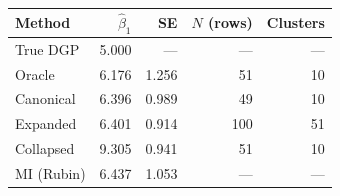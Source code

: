 \begin{tabular}{lrrrr}
\toprule
Method & $\hat\beta_1$ & SE & $N$ (rows) & Clusters \\
\midrule
True DGP & 5.000 & --- & --- & --- \\
Oracle & 6.176 & 1.256 & 51 & 10 \\
Canonical & 6.396 & 0.989 & 49 & 10 \\
Expanded & 6.401 & 0.914 & 100 & 51 \\
Collapsed & 9.305 & 0.941 & 51 & 10 \\
MI (Rubin) & 6.437 & 1.053 & --- & --- \\
\bottomrule
\end{tabular}
